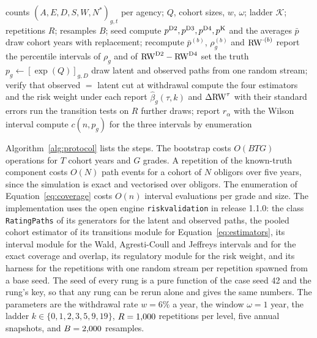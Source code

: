 \begin{algorithm}[htbp]
\caption{The measurement protocol. Inputs: the counts of the cohorts of each agency; a generator $Q$ with cohort sizes; a ladder of informativeness; a base seed. Outputs: the gap indices and risk weights with their intervals, the biases of the treatments with their standard errors, the rejection rates, and the exact coverages.}
\label{alg:protocol}
\begin{algorithmic}[1]
\Require counts $(A,E,D,S,W,N^{\ast})_{g,t}$ per agency; $Q$, cohort sizes, $w$, $\omega$; ladder $\mathcal K$; repetitions $R$; resamples $B$; seed
\State compute $p^{\mathrm{D2}},p^{\mathrm{D3}},p^{\mathrm{D4}},p^{\mathrm{K}}$ and the averages $\bar p$ 
  \State draw cohort years with replacement; recompute $\bar p^{(b)}$, $\rho_g^{(b)}$ and $\mathrm{RW}^{\cdot(b)}$ 
\EndFor
\State report the percentile intervals of $\rho_g$ and of $\mathrm{RW}^{\mathrm{D2}}-\mathrm{RW}^{\mathrm{D4}}$
\State set the truth $p_g\gets[\exp(Q)]_{g,D}$ 
    \State draw latent and observed paths from one random stream; verify that observed $=$ latent cut at withdrawal
    \State compute the four estimators and the risk weight under each 
  \EndFor
  \State report $\hat\beta_g(\tau,k)$ and $\Delta\mathrm{RW}^{\tau}$ with their standard errors 
  \State run the transition tests on $R$ further draws; report $\hat r_\alpha$ with the Wilson interval 
\EndFor
{}
  \State compute $c(n,p_g)$ for the three intervals by enumeration 
\EndFor
\end{algorithmic}
\end{algorithm}

Algorithm~\ref{alg:protocol} lists the steps. The bootstrap costs $O(BTG)$ operations for $T$ cohort years and $G$ grades. A repetition of the known-truth component costs $O(N)$ path events for a cohort of $N$ obligors over five years, since the simulation is exact and vectorised over obligors. The enumeration of Equation~\eqref{eq:coverage} costs $O(n)$ interval evaluations per grade and size. The implementation uses the open engine \texttt{riskvalidation} in release 1.1.0: the class \texttt{RatingPaths} of its generators for the latent and observed paths, the pooled cohort estimator of its transitions module for Equation~\eqref{eq:estimators}, its interval module for the Wald, Agresti-Coull and Jeffreys intervals and for the exact coverage and overlap, its regulatory module for the risk weight, and its harness for the repetitions with one random stream per repetition spawned from a base seed. The seed of every rung is a pure function of the case seed 42 and the rung's key, so that any rung can be rerun alone and gives the same numbers. The parameters are the withdrawal rate $w=6\%$ a year, the window $\omega=1$ year, the ladder $k\in\{0,1,2,3,5,9,19\}$, $R=1{,}000$ repetitions per level, five annual snapshots, and $B=2{,}000$ resamples.
